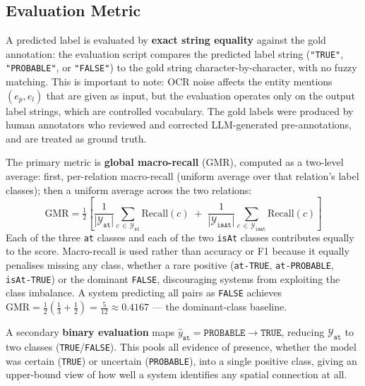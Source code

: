 \documentclass[
]{ceurart}
\theoremstyle{definition}
\begin{document}
\subsection{Evaluation Metric}

A predicted label is evaluated by \textbf{exact string equality} against the gold annotation: the evaluation script compares the predicted label string (\texttt{"TRUE"}, \texttt{"PROBABLE"}, or \texttt{"FALSE"}) to the gold string character-by-character, with no fuzzy matching.
This is important to note: OCR noise affects the entity mentions $(e_p, e_l)$ that are given as input, but the evaluation operates only on the output label strings, which are controlled vocabulary.
The gold labels were produced by human annotators who reviewed and corrected LLM-generated pre-annotations, and are treated as ground truth.

The primary metric is \textbf{global macro-recall} (GMR), computed as a two-level average: first, per-relation macro-recall (uniform average over that relation's label classes); then a uniform average across the two relations:
\begin{equation}\label{eq:gmr}
  \mathrm{GMR}
  = \tfrac{1}{2}\!\left[
    \frac{1}{|\mathcal{Y}_{\texttt{at}}|}\sum_{c\,\in\,\mathcal{Y}_{\texttt{at}}}\!\mathrm{Recall}(c)
    \;+\;
    \frac{1}{|\mathcal{Y}_{\texttt{isAt}}|}\sum_{c\,\in\,\mathcal{Y}_{\texttt{isAt}}}\!\mathrm{Recall}(c)
  \right]
\end{equation}
Each of the three \texttt{at} classes and each of the two \texttt{isAt} classes contributes equally to the score.
Macro-recall is used rather than accuracy or F1 because it equally penalises missing any class, whether a rare positive (\texttt{at-TRUE}, \texttt{at-PROBABLE}, \texttt{isAt-TRUE}) or the dominant \texttt{FALSE}, discouraging systems from exploiting the class imbalance.
A system predicting all pairs as \texttt{FALSE} achieves $\mathrm{GMR} = \tfrac{1}{2}\!\left(\tfrac{1}{3} + \tfrac{1}{2}\right) = \tfrac{5}{12} \approx \mathbf{0.4167}$ --- the dominant-class baseline.

A secondary \textbf{binary evaluation} maps $\hat{y}_{\texttt{at}} = \texttt{PROBABLE} \to \texttt{TRUE}$, reducing $\mathcal{Y}_{\texttt{at}}$ to two classes (\texttt{TRUE}/\texttt{FALSE}).
This pools all evidence of presence, whether the model was certain (\texttt{TRUE}) or uncertain (\texttt{PROBABLE}), into a single positive class, giving an upper-bound view of how well a system identifies any spatial connection at all.
\end{document}
